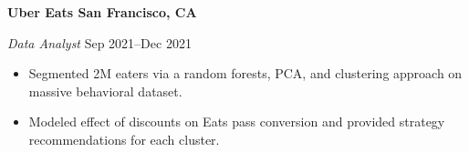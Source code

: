 \textbf{Uber Eats \hfill  San Francisco, CA} \par
\textit{Data Analyst} \hfill Sep 2021--Dec 2021 \par
\begin{itemize}
	\item Segmented 2M eaters via a random forests, PCA, and clustering approach on massive behavioral dataset.
	\item Modeled effect of discounts on Eats pass conversion and provided strategy recommendations for each cluster.
\end{itemize} \par